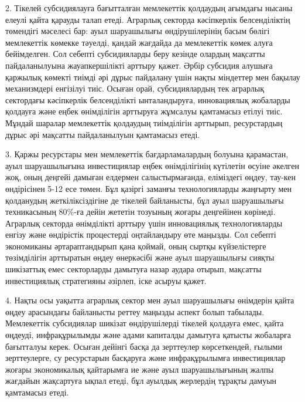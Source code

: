 {{2. Тікелей субсидиялауға бағытталған мемлекеттік қолдаудың ағымдағы
нысаны елеулі қайта қарауды талап етеді. Аграрлық секторда кәсіпкерлік
белсенділіктің төмендігі мәселесі бар: ауыл шаруашылығы өндірушілерінің
басым бөлігі мемлекеттік көмекке тәуелді, қандай жағдайда да мемлекеттік
көмек алуға бейімделген. Сол себепті субсидияларды беру кезінде олардың
мақсатты пайдаланылуына жауапкершілікті арттыру қажет. Әрбір субсидия
алушыға қаржылық көмекті тиімді әрі дұрыс пайдалану үшін нақты міндеттер
мен бақылау механизмдері енгізілуі тиіс. Осыған орай, субсидиялардың тек
аграрлық сектордағы кәсіпкерлік белсенділікті ынталандыруға,
инновациялық жобаларды қолдауға және еңбек өнімділігін арттыруға
жұмсалуы қамтамасыз етілуі тиіс. Мұндай шаралар мемлекеттік қолдаудың
тиімділігін арттырып, ресурстардың дұрыс әрі мақсатты пайдаланылуын
қамтамасыз етеді.

3. Қаржы ресурстары мен мемлекеттік бағдарламалардың болуына қарамастан,
ауыл шаруашылығына инвестициялар еңбек өнімділігінің күтілетін өсуіне
әкелген жоқ, оның деңгейі дамыған елдермен салыстырмағанда, еліміздегі
өңдеу, тау-кен өндірісінен 5-12 есе төмен. Бұл қазіргі заманғы
технологияларды жаңғырту мен қолданудың жеткіліксіздігіне де тікелей
байланысты, бұл ауыл шаруашылығы техникасының 80\%-ға дейін жететін
тозуының жоғары деңгейінен көрінеді. Аграрлық секторда өнімділікті
арттыру үшін инновациялық технологияларды енгізу және өндірістік
процестерді оңтайландыру өте маңызды. Сол себепті экономиканы
әртараптандырып қана қоймай, оның сыртқы күйзелістерге төзімділігін
арттыратын өңдеу өнеркәсібі және ауыл шаруашылығы сияқты шикізаттық емес
секторларды дамытуға назар аудара отырып, мақсатты инвестициялық
стратегияны әзірлеп, іске асыруы қажет.

4. Нақты осы уақытта аграрлық сектор мен ауыл шаруашылығы өнімдерін
қайта өңдеу арасындағы байланысты реттеу маңызды аспект болып табылады.
Мемлекеттік субсидиялар шикізат өндірушілерді тікелей қолдауға емес,
қайта өңдеуді, инфрақұрылымды және адами капиталды дамытуға қатысты
жобаларға бағытталуы керек. Осыған дейінгі басқа да зерттеулер
көрсеткендей, ғылыми зерттеулерге, су ресурстарын басқаруға және
инфрақұрылымға инвестициялар жоғары экономикалық қайтарымға ие және ауыл
шаруашылығының жалпы жағдайын жақсартуға ықпал етеді, бұл ауылдық
жерлердің тұрақты дамуын қамтамасыз етеді.

}}
